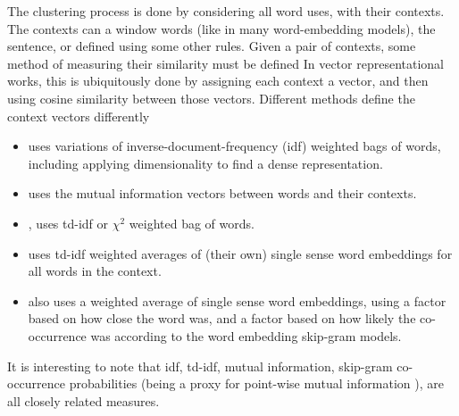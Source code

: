 \documentclass[12pt,parskip]{komatufte}
\begin{document}

The clustering process is done by considering all word uses, with their contexts.
The contexts can a window words (like in many word-embedding models), the sentence, or defined using some other rules.
Given a pair of contexts, some method of measuring their similarity must be defined
In vector representational works, this is ubiquitously done by assigning each context a vector, and then using cosine similarity between those vectors.
Different methods define the context vectors differently
\begin{itemize}
\item \textcite{Schutze:1998wordsenseclustering} uses variations of inverse-document-frequency (idf) weighted bags of words, including applying dimensionality to find a dense representation.
\item \textcite{pantel2002WSI} uses the mutual information vectors between words and their contexts.
\item \textcite{Reisinger2010}, uses td-idf or $\chi^2$ weighted bag of words.
\item {} uses td-idf weighted averages of (their own) single sense word embeddings for all words in the context.
\item  {} also uses a weighted average of single sense word embeddings, using a factor based on how close the word was, and a factor based on how likely the co-occurrence was according to the word embedding skip-gram models.

\end{itemize}
It is interesting to note that idf, td-idf, mutual information, skip-gram co-occurrence probabilities (being a proxy for point-wise mutual information \parencite{levy2014neural}), are all closely related measures.
\end{document}
